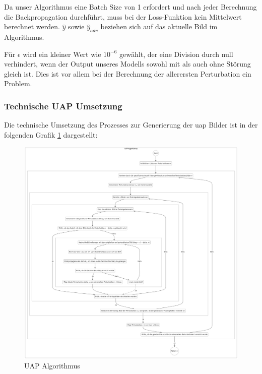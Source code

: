 Da unser Algorithmus eine Batch Size von 1 erfordert und nach jeder Berechnung die Backpropagation durchführt, muss bei der Loss-Funktion kein Mittelwert berechnet werden. $\hat{y}$ sowie $\hat{y}_{adv}$ beziehen sich auf das aktuelle Bild im Algorithmus.

Für $\epsilon$ wird ein kleiner Wert wie $10^{-6}$ gewählt, der eine Division durch null verhindert, wenn der Output unseres Modells sowohl mit als auch ohne Störung gleich ist. Dies ist vor allem bei der Berechnung der allerersten Perturbation ein Problem.

\newpage
\subsubsection{Technische UAP Umsetzung}
Die technische Umsetzung des Prozesses zur Generierung der \acrshort{uap} Bilder ist in der folgenden Grafik \ref{fig:05-uap_algorithm} dargestellt:

\begin{figure}[H]
    \centering
    \includegraphics[width=14.3cm]{01-images/04-methodik/UAP_ALG.png}
    \caption{UAP Algorithmus}
    \label{fig:05-uap_algorithm}
\end{figure}


